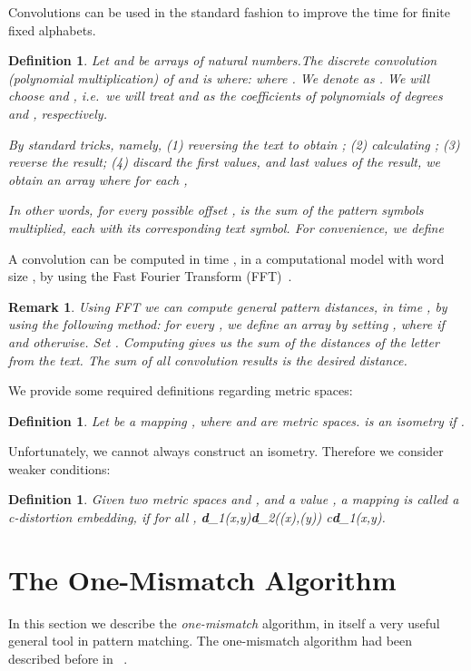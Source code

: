 \documentclass[11pt]{article}
\newtheorem{rem}[thm]{Remark}
\newtheorem{dfn}[thm]{Definition}
\newcommand{\be}{}
\newcommand{\dist}{\textbf{d}}
\begin{document}
Convolutions can be used in the standard fashion to improve the time
for finite fixed alphabets.
\begin{dfn}  \label{def:FFT}
Let  and  be arrays of
natural numbers.The {\em discrete convolution (polynomial multiplication) of  and
} is  where:
 where
. We denote  as . We will choose  and
, i.e.\ we will treat  and  as the coefficients of
polynomials of degrees  and , respectively.

By standard tricks, namely, (1) reversing the text to obtain ;
(2) calculating ; (3) reverse the result; (4) discard the
first  values, and last  values of the result, we obtain
an array  where for each ,

In other words, for every possible offset ,  is the sum of
the pattern symbols multiplied, each with its corresponding text
symbol. For convenience, we define 
\end{dfn}
A convolution can be computed in time , in a
computational model with word size , by using the Fast
Fourier Transform (FFT)~\cite{CLR-92}.
\begin{rem}
Using FFT we can compute general pattern distances, in time
, by using the following method: for
every , we define an array  by setting
, where  if  and 
otherwise. Set . Computing  gives us the sum of the distances of the letter  from
the text. The sum of all convolution results is the desired
distance.
\end{rem}

We provide some required definitions regarding metric spaces:
\begin{dfn}Let  be a mapping , where
 and  are metric spaces.  is an
\emph{isometry} if .
\end{dfn}
Unfortunately, we cannot always construct an isometry. Therefore we
consider weaker conditions:
\begin{dfn}
\label{def:D-emb} Given two metric spaces  and
, and a value , a mapping  is called a {\em c-distortion embedding}, if for all ,
\be \dist_1(x,y)\leq \dist_2(\rho(x),\rho(y))\leq
c\cdot\dist_1(x,y).
 \ee
\end{dfn}






\section{The One-Mismatch Algorithm}
In this section we describe the \emph{one-mismatch} algorithm,
in itself a very useful general tool in pattern matching. The
one-mismatch algorithm had been described before in
~\cite{CC07,CPER07}.
\end{document}
